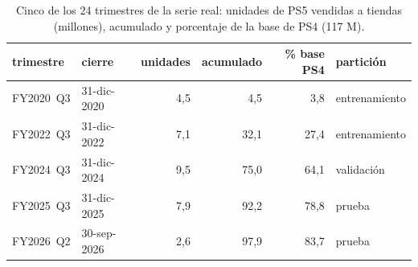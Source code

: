 \begin{table}[htb]
\centering
\caption{Cinco de los 24 trimestres de la serie real: unidades de PS5 vendidas a tiendas (millones), acumulado y porcentaje de la base de PS4 (117 M).}
\label{tab:datos}
\small
\setlength{\tabcolsep}{4pt}
\begin{tabular}{llrrrl}
\toprule
trimestre & cierre & unidades & acumulado & \% base PS4 & partición \\
\midrule
FY2020~Q3 & 31-dic-2020 & 4,5 & 4,5 & 3,8 & entrenamiento \\
FY2022~Q3 & 31-dic-2022 & 7,1 & 32,1 & 27,4 & entrenamiento \\
FY2024~Q3 & 31-dic-2024 & 9,5 & 75,0 & 64,1 & validación \\
FY2025~Q3 & 31-dic-2025 & 7,9 & 92,2 & 78,8 & prueba \\
FY2026~Q2 & 30-sep-2026 & 2,6 & 97,9 & 83,7 & prueba \\
\bottomrule
\end{tabular}
\end{table}
